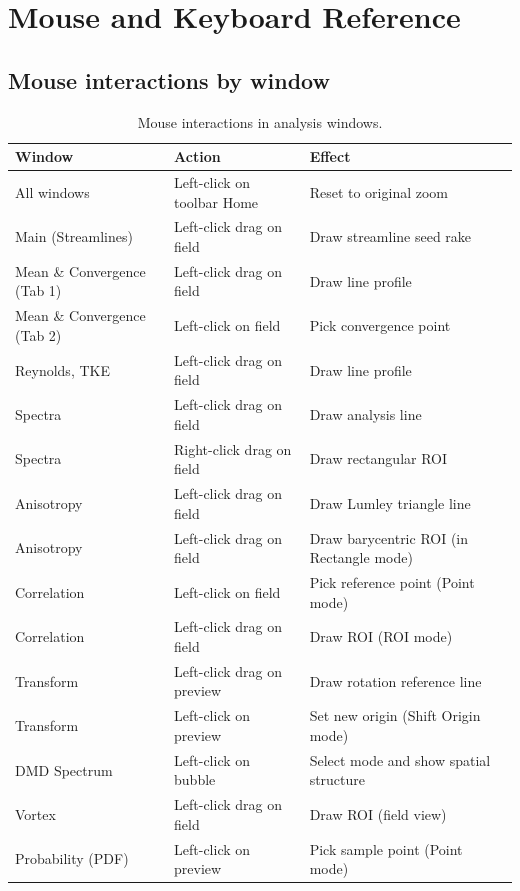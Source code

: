 \section{Mouse and Keyboard Reference}

\subsection{Mouse interactions by window}

\begin{table}[htbp]
\centering
\caption{Mouse interactions in analysis windows.}
\begin{tabular}{lp{4cm}p{6.5cm}}
\toprule
\textbf{Window} & \textbf{Action} & \textbf{Effect} \\
\midrule
All windows       & Left-click on toolbar Home & Reset to original zoom \\
Main (Streamlines) & Left-click drag on field & Draw streamline seed rake \\
Mean \& Convergence (Tab 1) & Left-click drag on field & Draw line profile \\
Mean \& Convergence (Tab 2) & Left-click on field & Pick convergence point \\
Reynolds, TKE     & Left-click drag on field & Draw line profile \\
Spectra           & Left-click drag on field & Draw analysis line \\
Spectra           & Right-click drag on field & Draw rectangular ROI \\
Anisotropy        & Left-click drag on field & Draw Lumley triangle line \\
Anisotropy        & Left-click drag on field & Draw barycentric ROI (in Rectangle mode) \\
Correlation       & Left-click on field & Pick reference point (Point mode) \\
Correlation       & Left-click drag on field & Draw ROI (ROI mode) \\
Transform         & Left-click drag on preview & Draw rotation reference line \\
Transform         & Left-click on preview & Set new origin (Shift Origin mode) \\
DMD Spectrum      & Left-click on bubble & Select mode and show spatial structure \\
Vortex            & Left-click drag on field & Draw ROI (field view) \\
Probability (PDF) & Left-click on preview & Pick sample point (Point mode) \\

\end{tabular}
\end{table}
